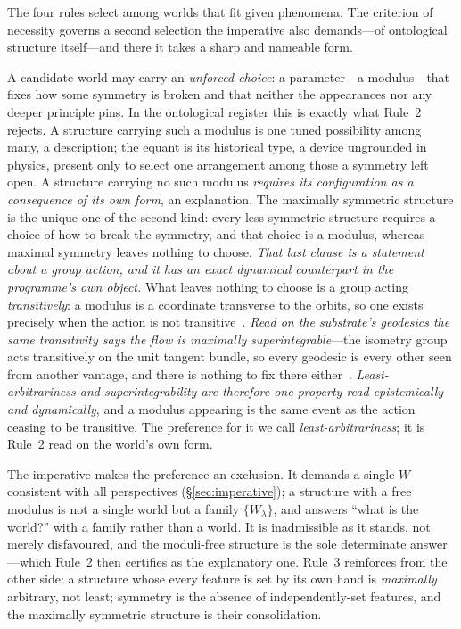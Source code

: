 \documentclass[11pt,a4paper]{article}
\begin{document}
The four rules select among worlds that fit given phenomena. The criterion of necessity governs a second selection the imperative also demands---of ontological structure itself---and there it takes a sharp and nameable form.

A candidate world may carry an \emph{unforced choice}: a parameter---a modulus---that fixes how some symmetry is broken and that neither the appearances nor any deeper principle pins. In the ontological register this is exactly what Rule~2 rejects. A structure carrying such a modulus is one tuned possibility among many, a description; the equant is its historical type, a device ungrounded in physics, present only to select one arrangement among those a symmetry left open. A structure carrying no such modulus \emph{requires its configuration as a consequence of its own form}, an explanation. The maximally symmetric structure is the unique one of the second kind: every less symmetric structure requires a choice of how to break the symmetry, and that choice is a modulus, whereas maximal symmetry leaves nothing to choose. \emph{That last clause is a statement about a group action, and it has an exact dynamical counterpart in the programme's own object.} What leaves nothing to choose is a group acting \emph{transitively}: a modulus is a coordinate transverse to the orbits, so one exists precisely when the action is not transitive~\cite{JanzenAlgebroid}. \emph{Read on the substrate's geodesics the same transitivity says the flow is maximally superintegrable}---the isometry group acts transitively on the unit tangent bundle, so every geodesic is every other seen from another vantage, and there is nothing to fix there either~\cite{JanzenGeometricCore}. \emph{Least-arbitrariness and superintegrability are therefore one property read epistemically and dynamically}, and a modulus appearing is the same event as the action ceasing to be transitive. The preference for it we call \emph{least-arbitrariness}; it is Rule~2 read on the world's own form.

The imperative makes the preference an exclusion. It demands a single $W$ consistent with all perspectives (\S\ref{sec:imperative}); a structure with a free modulus is not a single world but a family $\{W_\lambda\}$, and answers ``what is the world?'' with a family rather than a world. It is inadmissible as it stands, not merely disfavoured, and the moduli-free structure is the sole determinate answer---which Rule~2 then certifies as the explanatory one. Rule~3 reinforces from the other side: a structure whose every feature is set by its own hand is \emph{maximally} arbitrary, not least; symmetry is the absence of independently-set features, and the maximally symmetric structure is their consolidation.
\end{document}
